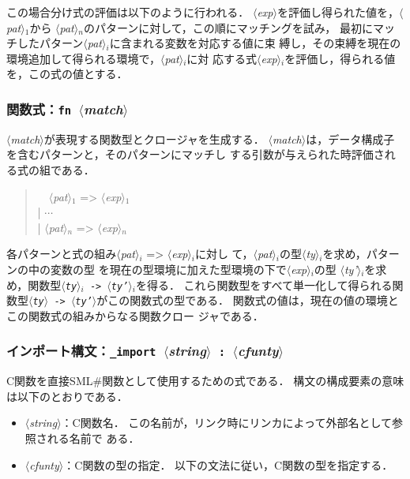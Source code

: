 \documentclass{jbook}
\newcommand{\smlsharp}{SML\#}
\newcommand{\code}[1]{\mbox{\large\tt #1}}
\newcommand{\nonterm}[1]{\mbox{$\langle$}{\it #1}\mbox{$\rangle$}}
\newcommand{\term}[1]{\mbox{{\tt #1}}}
\newcommand{\myem}{\mbox{\ \ }}
\newenvironment{program}{\begin{quote}\begin{tt}}%
                        {\end{tt}\end{quote}}
\begin{document}
	この場合分け式の評価は以下のように行われる．
	\nonterm{exp}を評価し得られた値を，\nonterm{pat}$_1$から
\nonterm{pat}$_n$のパターンに対して，この順にマッチングを試み，
最初にマッチしたパターン\nonterm{pat}$_i$に含まれる変数を対応する値に束
縛し，その束縛を現在の環境追加して得られる環境で，\nonterm{pat}$_i$に対
応する式\nonterm{exp}$_i$を評価し，得られる値を，この式の値とする．


\subsubsection{関数式：\term{fn}\ \nonterm{match}}

	\nonterm{match}が表現する関数型とクロージャを生成する．
	\nonterm{match}は，データ構成子を含むパターンと，そのパターンにマッチし
する引数が与えられた時評価される式の組である．
\begin{program}
\myem  \nonterm{pat}$_1$ => \nonterm{exp}$_1$
\\
| $\cdots$
\\
| \nonterm{pat}$_n$ => \nonterm{exp}$_n$
\end{program}
	各パターンと式の組み\nonterm{pat}$_i$ => \nonterm{exp}$_i$に対し
て，\nonterm{pat}$_i$の型\nonterm{ty}$_i$を求め，パターンの中の変数の型
を現在の型環境に加えた型環境の下で\nonterm{exp}$_i$の型
\nonterm{ty'}$_i$を求め，関数型\code{\nonterm{ty}$_i$ ->
\nonterm{ty'}$_i$}を得る．
	これら関数型をすべて単一化して得られる関数型\code{\nonterm{ty}
-> \nonterm{ty'}}がこの関数式の型である．
	関数式の値は，現在の値の環境とこの関数式の組みからなる関数クロー
ジャである．


\subsubsection{インポート構文：\term{\_import}\ \nonterm{string}\ \term{:}\ \nonterm{cfunty}}

	C関数を直接\smlsharp{}関数として使用するための式である．
	構文の構成要素の意味は以下のとおりである．
\begin{itemize}
\item \nonterm{string}：C関数名．
	この名前が，リンク時にリンカによって外部名として参照される名前で
ある．
\item \nonterm{cfunty}：C関数の型の指定．
	以下の文法に従い，C関数の型を指定する．
\end{itemize}	
\end{document}
